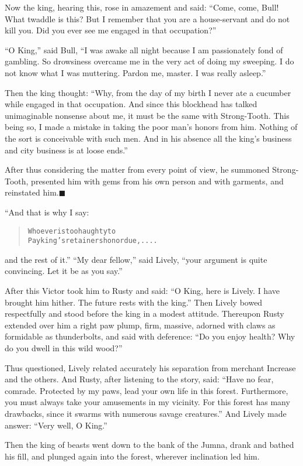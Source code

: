 \documentclass[article, twoside, 14pt]{memoir}
\newcommand{\qed}{\hfill \ensuremath{\blacksquare}}
\renewenvironment{verbatim}{%
\begin{quote}%
\vskip -10pt%
\begin{alltt}\normalfont\large}{\end{alltt}%
\end{quote}%
\vskip -10pt
} %
\begin{document}
Now the king, hearing this, rose in amazement and said:
``Come, come, Bull! What twaddle is this? But I remember that you are a house-servant and do not kill you. Did you ever see me engaged in that occupation?''

``O King,'' said Bull,
``I was awake all night because I am passionately fond of gambling. So drowsiness overcame me in the very act of doing my sweeping. I do not know what I was muttering. Pardon me, master. I was really asleep.''

Then the king thought:
``Why, from the day of my birth I never ate a cucumber while engaged in that occupation. And since this blockhead has talked unimaginable nonsense about me, it must be the same with Strong-Tooth. This being so, I made a mistake in taking the poor man's honors from him. Nothing of the sort is conceivable with such men. And in his absence all the king's business and city business is at loose ends.''

After thus considering the matter from every point of view, he
summoned Strong-Tooth, presented him with gems from his own person
and with garments, and reinstated him.\hyperref[s4]{\qed}

“And that is why I say:

\begin{verbatim}
Whoever is too haughty to
Pay king's retainers honor due, ....
\end{verbatim}
and the rest of it.” ``My dear fellow,'' said Lively,
``your argument is quite convincing. Let it be as you say.''

After this Victor took him to Rusty and said:
``O King, here is Lively. I have brought him hither. The future rests with the king.''
Then Lively bowed respectfully and stood before the king in a
modest attitude. Thereupon Rusty extended over him a right paw
plump, firm, massive, adorned with claws as formidable as
thunderbolts, and said with deference:
``Do you enjoy health? Why do you dwell in this wild wood?''

Thus questioned, Lively related accurately his separation from
merchant Increase and the others. And Rusty, after listening to the
story, said:
``Have no fear, comrade. Protected by my paws, lead your own life in this forest. Furthermore, you must always take your amusements in my vicinity. For this forest has many drawbacks, since it swarms with numerous savage creatures.''
And Lively made answer: ``Very well, O King.''

Then the king of beasts went down to the bank of the Jumna, drank
and bathed his fill, and plunged again into the forest, wherever
inclination led him.
\end{document}
